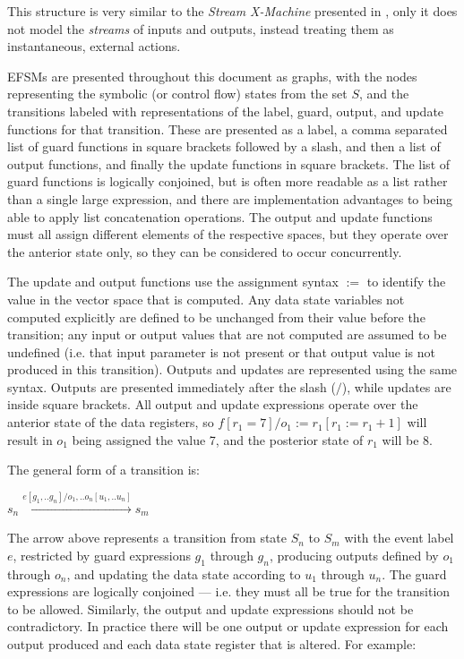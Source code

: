 This structure is very similar to the \emph{Stream X-Machine} presented in \cite{StreamXMachines}, only it does not model the \emph{streams} of inputs and outputs, instead treating them as instantaneous, external actions.

EFSMs are presented throughout this document as graphs, with the nodes representing the symbolic (or control flow) states from the set $S$, and the transitions labeled with representations of the label, guard, output, and update functions for that transition. These are presented as a label, a comma separated list of guard functions in square brackets followed by a slash, and then a list of output functions, and finally the update functions in square brackets. The list of guard functions is logically conjoined, but is often more readable as a list rather than a single large expression, and there are implementation advantages to being able to apply list concatenation operations. The output and update functions must all assign different elements of the respective spaces, but they operate over the anterior state only, so they can be considered to occur concurrently.

The update and output functions use the assignment syntax $:=$ to identify the value in the vector space that is computed. Any data state variables not computed explicitly are defined to be unchanged from their value before the transition; any input or output values that are not computed are assumed to be undefined (i.e. that input parameter is not present or that output value is not produced in this transition). Outputs and updates are represented using the same syntax. Outputs are presented immediately after the slash ($/$), while updates are inside square brackets. All output and update expressions operate over the anterior state of the data registers, so $f[r_1 = 7]/o_1 := r_1 [r_1 := r_1 + 1]$ will result in $o_1$ being assigned the value 7, and the posterior state of $r_1$ will be 8.

The general form of a transition is: 

\begin{center}
$s_n \xrightarrow{e[g_1, .. g_n]/o_1, .. o_n [u_1, .. u_n]} s_m$ 
\end{center}

The arrow above represents a transition from state $S_n$ to $S_m$ with the event label $e$, restricted by guard expressions $g_1$ through $g_n$, producing outputs defined by $o_1$ through $o_n$, and updating the data state according to $u_1$ through $u_n$. The guard expressions are logically conjoined --- i.e. they must all be true for the transition to be allowed. Similarly, the output and update expressions should not be contradictory. In practice there will be one output or update expression for each output produced and each data state register that is altered. For example:

